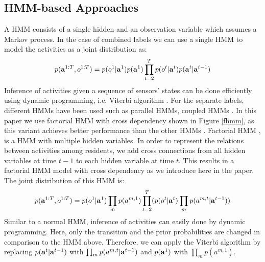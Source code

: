 \subsection{HMM-based Approaches}
A HMM \cite{Rabiner_1990} consists of a single hidden  and an
observation variable  which assumes a Markov process. 
In the case of combined labels we can use a single HMM to model the activities as a joint distribution as:
\begin{equation}
  p(\mathbf{a}^{1:T},o^{1:T}) = p(o^1|\mathbf{a}^{1})p(\mathbf{a}^{1})\prod_{t=2}^Tp(o^t|\mathbf{a}^{t})p(\mathbf{a}^{t}|\mathbf{a}^{t-1})
\end{equation}
Inference of activities given a sequence of sensors'
 states can be done efficiently using dynamic programming,
 i.e. Viterbi algorithm \cite{Rabiner_1990}. For the separate labels,
 different HMMs have been used such as parallel HMMs, coupled HMMs
 \cite{Wang_2011,Son_2017}. In this paper we use factorial HMM with
 cross dependency shown in Figure \ref{fhmm}, as this variant achieves
 better performance than the other HMMs \cite{Son_2017}. Factorial HMM
 \cite{Ghahramani_1997}, is a HMM with multiple hidden variables. In
 order to represent the relations between activities among residents,
 we add cross connections from all hidden variables at time $t-1$ to
 each hidden variable at time $t$. This results in a factorial HMM
 model with cross dependency as we introduce here in the paper. The
 joint distribution of this HMM is:
\begin{equation}
  p(\mathbf{a}^{1:T},o^{1:T}) = p(o^1|\mathbf{a}^{1})\prod_m p(a^{m,1})\prod_{t=2}^T(p(o^t|\mathbf{a}^{t})\prod_mp(a^{m,t}|\mathbf{a}^{t-1})) 
\end{equation}
Similar to a normal HMM, inference of activities can easily done by dynamic programming. Here, only the transition and the prior probabilities are changed in
comparison to the HMM above. Therefore, we
can apply the Viterbi algorithm  by replacing
$p(\mathbf{a}^t|\mathbf{a}^{t-1})$ with $\prod_m p(a^{m,t}|\mathbf{a}^{t-1})$ and $p(\mathbf{a}^1)$ with
$\prod_m p(a^{m,1})$.
\label{sec:impl}
